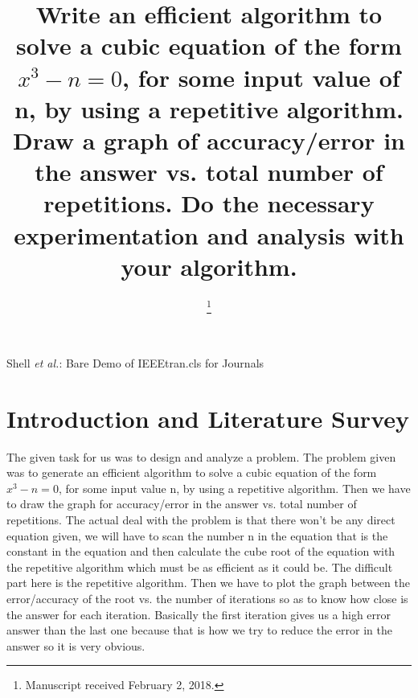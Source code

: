 \documentclass[conference]{IEEEtran}
\begin{document}
\title{Write an efficient algorithm to solve a cubic equation of the form $ x^3-n = 0$, for some input value of n, by using a repetitive algorithm. Draw a graph of accuracy/error in the answer vs. total number of repetitions. Do the necessary experimentation and analysis with your algorithm.}

\author{
\and
{}
\and
{}
\and
{}
\thanks{Manuscript received February 2, 2018.}}

{Shell \MakeLowercase{\textit{et al.}}: Bare Demo of IEEEtran.cls for Journals}

\maketitle

\IEEEpeerreviewmaketitle

\section{\textbf{Introduction and Literature Survey}}
The given task for us was to design and analyze a problem. The problem given was to generate an efficient algorithm  to solve a cubic equation of the form $x^3-n=0$, for some input value n, by using a repetitive algorithm. Then we have to draw the graph for accuracy/error in the answer vs. total number of repetitions. The actual deal with the problem is that there won’t be any direct equation given, we will have to scan the number n in the equation that is the constant in the equation and then calculate the cube root of the equation with the repetitive algorithm which must be as efficient as it could be. The difficult part here is the repetitive algorithm. Then we have to plot the graph between the error/accuracy of the root vs. the number of iterations so as to know how close is the answer for each iteration. Basically the first iteration gives us a high error answer than the last one because that is how we try to reduce the error in the answer so it is very obvious.  
\end{document}
